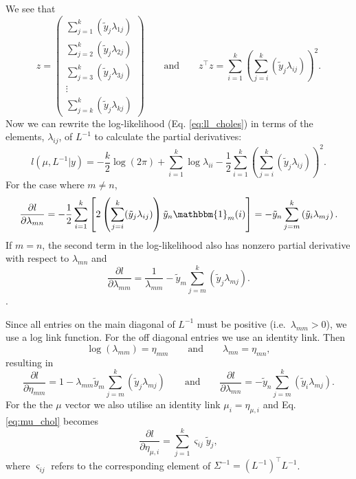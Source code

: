 \documentclass{article}
\begin{document}
%
We see that 
%
\begin{equation}
	z =
  \begin{pmatrix}
    \sum_{j=1}^k (\tilde{y}_j \lambda_{1j}) \\
    \sum_{j=2}^k (\tilde{y}_j \lambda_{2j}) \\
    \sum_{j=3}^k (\tilde{y}_j \lambda_{3j}) \\
    \vdots \\
    \sum_{j=k}^k (\tilde{y}_j \lambda_{kj}) 
  \end{pmatrix}
  \qquad \text{and} \qquad
  z^\top z =
	\sum_{i=1}^k \left( \sum_{j=i}^k \left( \tilde{y}_j \lambda_{ij} \right) \right)^2.
\end{equation}
%
Now we can rewrite the log-likelihood (Eq. \ref{eq:ll_choles}) in terms of the 
elements, $\lambda_{ij}$, of $L^{-1}$ to calculate the partial derivatives:
%
\begin{equation}
	l(\mu, L^{-1}|y) = -\frac{k}{2}\log(2\pi) + \sum_{i=1}^k 
	\log{\lambda_{ii}} - \frac{1}{2} \sum_{i=1}^k 
	\left( \sum_{j=i}^k \left( \tilde{y}_j \lambda_{ij} 
	\right) \right)^2.
 \label{eq:ll_chol_terms}
\end{equation}
%
For the case where $m \neq n$, 
%
\begin{equation}
  \frac{\partial l}{\partial \lambda_{mn}} = 
  -\frac{1}{2} \sum_{i=1}^k \left[2 \left(\sum_{j=i}^k (\tilde{y}_j \lambda_{ij}) 
	\right) \tilde{y}_n \mathbbm{1}_m(i) \right] = 
  - \tilde{y}_n \sum_{j = m}^{k} \left( \tilde{y}_i \lambda_{mj} \right).	
\end{equation}
%
If $m = n$, the second term in the log-likelihood also has nonzero partial 
derivative with respect to $\lambda_{mn}$ and
%
\begin{equation}
  \frac{\partial l}{\partial \lambda_{mm}} = 
	\frac{1}{\lambda_{mm}}- \tilde{y}_m \sum_{j = m}^{k} 
	\left( \tilde{y}_j \lambda_{mj} \right).	
\end{equation}.

Since all entries on the main diagonal of $L^{-1}$ must be positive 
(i.e.\ $\lambda_{mm} > 0$), we use a log link function. For the 
off diagonal entries we use an identity link. Then
%
\begin{equation}
	\log(\lambda_{mm}) = \eta_{mm} \qquad \text{and} \qquad  
        \lambda_{mn} = \eta_{mn},
\end{equation}
%
resulting in 
%
\begin{equation}
  \frac{\partial l}{\partial \eta_{mm}} = 
	1 - \lambda_{mm} \tilde{y}_m \sum_{j=m}^k (\tilde{y}_j \lambda_{mj})
  \qquad \text{and} \qquad
  \frac{\partial l}{\partial \lambda_{mn}} = 
	- \tilde{y}_n \sum_{j = m}^{k} \left( \tilde{y}_i \lambda_{mj} \right).
\end{equation}
%
For the the $\mu$ vector we also utilise an identity link 
$\mu_i = \eta_{\mu,i}$ and Eq. \ref{eq:mu_chol} becomes
%
\begin{equation}
  \frac{\partial l}{\partial \eta_{\mu, i}} = 
	\sum_{j=1}^k \varsigma_{ij} \tilde{y}_j, 
\end{equation}
%
where $\varsigma_{ij}$ refers to the corresponding element of 
$\Sigma^{-1} = (L^{-1})^\top L^{-1}$.
\end{document}
